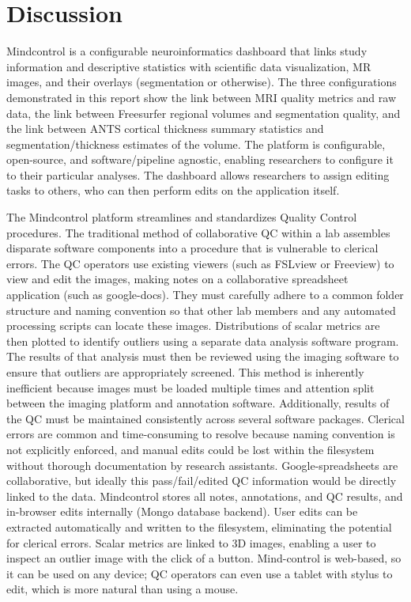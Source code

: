 \section{Discussion}

Mindcontrol is a configurable neuroinformatics dashboard that links study information and descriptive statistics with scientific data visualization, MR images, and their overlays (segmentation or otherwise). The three configurations demonstrated in this report show the link between MRI quality metrics and raw data, the link between Freesurfer regional volumes and segmentation quality, and the link between ANTS cortical thickness summary statistics and segmentation/thickness estimates of the volume. The platform is configurable, open-source, and software/pipeline agnostic, enabling researchers to configure it to their particular analyses. The dashboard allows researchers to assign editing tasks to others, who can then perform edits on the application itself. 

The Mindcontrol platform streamlines and standardizes Quality Control procedures. The traditional method of collaborative QC within a lab assembles disparate software components into a procedure that is vulnerable to clerical errors. The QC operators use existing viewers (such as FSLview or Freeview) to view and edit the images, making notes on a collaborative spreadsheet application (such as google-docs). They must carefully adhere to a common folder structure and naming convention so that other lab members and any automated processing scripts can locate these images. Distributions of scalar metrics are then plotted to identify outliers using a separate data analysis software program. The results of that analysis must then be reviewed using the imaging software to ensure that outliers are appropriately screened. This method is inherently inefficient because images must be loaded multiple times and attention split between the imaging platform and annotation software. Additionally, results of the QC must be maintained consistently across several software packages. Clerical errors are common and time-consuming to resolve because naming convention is not explicitly enforced, and manual edits could be lost within the filesystem without thorough documentation by research assistants. Google-spreadsheets are collaborative, but ideally this pass/fail/edited QC information would be directly linked to the data. Mindcontrol stores all notes, annotations, and QC results, and in-browser edits internally (Mongo database backend). User edits can be extracted automatically and written to the filesystem, eliminating the potential for clerical errors. Scalar metrics are linked to 3D images, enabling a user to inspect an outlier image with the click of a button. Mind-control is web-based, so it can be used on any device; QC operators can even use a tablet with stylus to edit, which is more natural than using a mouse.

